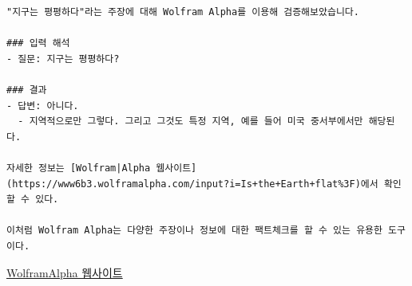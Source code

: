 \documentclass[
  letterpaper,
]{book}
\begin{document}
\begin{tcolorbox}[enhanced jigsaw, opacityback=0, opacitybacktitle=0.6, colback=white, rightrule=.15mm, coltitle=black, colframe=quarto-callout-note-color-frame, colbacktitle=quarto-callout-note-color!10!white, bottomrule=.15mm, bottomtitle=1mm, breakable, title=\textcolor{quarto-callout-note-color}{\faInfo}\hspace{0.5em}{``지구는 평평하다''라는 주장을 검증해줘.}, titlerule=0mm, leftrule=.75mm, toptitle=1mm, left=2mm, arc=.35mm, toprule=.15mm]

\begin{verbatim}
"지구는 평평하다"라는 주장에 대해 Wolfram Alpha를 이용해 검증해보았습니다.

### 입력 해석
- 질문: 지구는 평평하다?

### 결과
- 답변: 아니다.
  - 지역적으로만 그렇다. 그리고 그것도 특정 지역, 예를 들어 미국 중서부에서만 해당된다.

자세한 정보는 [Wolfram|Alpha 웹사이트](https://www6b3.wolframalpha.com/input?i=Is+the+Earth+flat%3F)에서 확인할 수 있다.

이처럼 Wolfram Alpha는 다양한 주장이나 정보에 대한 팩트체크를 할 수 있는 유용한 도구이다.
\end{verbatim}

\href{https://www6b3.wolframalpha.com/input?i=Is+the+Earth+flat\%3F}{Wolfram\textbar Alpha
웹사이트}

\end{tcolorbox}
\end{document}
